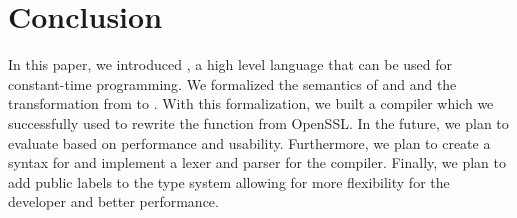 \section{Conclusion}
In this paper, we introduced \constc, a high level language that can be used for constant-time programming. We formalized the semantics of \constc and \ccore and the transformation from \constc to \ccore. With this formalization, we built a \constc compiler which we successfully used to rewrite the  function from OpenSSL. In the future, we plan to evaluate \constc based on performance and usability. Furthermore, we plan to create a syntax for \constc and implement a lexer and parser for the compiler. Finally, we plan to add public labels to the type system allowing for more flexibility for the developer and better performance.
